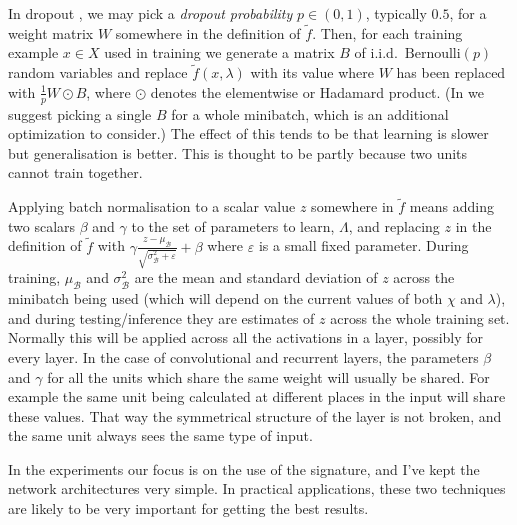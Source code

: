 In dropout \cite{dropout1,dropout2}, we may pick a \emph{dropout probability} $p\in(0,1)$, typically $0.5$, for a weight matrix $W$ somewhere in the definition of $\tilde f$.
Then, for each training example $x\in X$ used in training we generate a matrix $B$ of i.i.d.~$\text{Bernoulli}(p)$ random variables and replace $\tilde f(x,\lambda)$ with its value where $W$ has been replaced with $\frac1p W\odot B$, where $\odot$ denotes the elementwise or Hadamard product. 
(In \cite{batchwiseDropout} we suggest picking a single $B$ for a whole minibatch, which is an additional optimization to consider.)
The effect of this tends to be that learning is slower but generalisation is better. This is thought to be partly because two units cannot train together.

Applying batch normalisation \cite{batchNorm} to a scalar value $z$ somewhere in $\tilde f$ means adding two scalars $\beta$ and $\gamma$ to the set of parameters to learn, $\Lambda$, and replacing $z$ in the definition of $\tilde f$ with $\gamma\frac{z-\mu_{\mathcal{B}}}{\sqrt{\sigma^2_{\mathcal{B}}+\varepsilon}}+\beta$ where $\varepsilon$ is a small fixed parameter.
During training, $\mu_{\mathcal{B}}$ and $\sigma^2_{\mathcal{B}}$ are the mean and standard deviation of $z$ across the minibatch being used (which will depend on the current values of both  $\chi$ and $\lambda$), and during testing/inference they are estimates of $z$ across the whole training set.
Normally this will be applied across all the activations in a layer, possibly for every layer.
In the case of convolutional and recurrent layers, the parameters $\beta$ and $\gamma$ for all the units which share the same weight will usually be shared.
For example the same unit being calculated at different places in the input will share these values. That way the symmetrical structure of the layer is not broken, and the same unit always sees the same type of input.

In the experiments our focus is on the use of the signature, and I've kept the network architectures very simple. In practical applications, these two techniques are likely to be very important for getting the best results.
